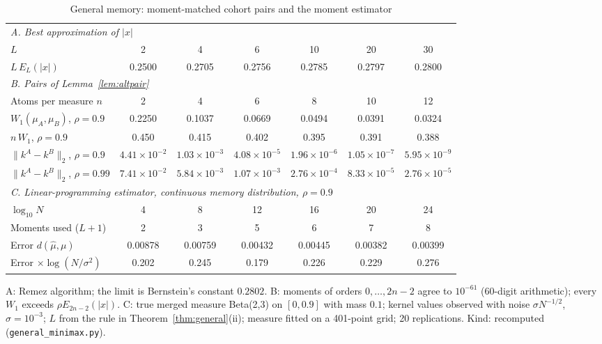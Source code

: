 \begin{table}[t]\centering\small
\begin{threeparttable}
\caption{General memory: moment-matched cohort pairs and the moment estimator}\label{tab:general}
\setlength{\tabcolsep}{3.5pt}
\begin{tabular}{lcccccc}
\toprule
\multicolumn{7}{l}{\emph{A. Best approximation of $|x|$}}\\
$L$ & 2 & 4 & 6 & 10 & 20 & 30\\
$L\,E_L(|x|)$ & 0.2500 & 0.2705 & 0.2756 & 0.2785 & 0.2797 & 0.2800\\
\midrule
\multicolumn{7}{l}{\emph{B. Pairs of Lemma~\ref{lem:altpair}}}\\
Atoms per measure $n$ & 2 & 4 & 6 & 8 & 10 & 12\\
$W_1(\mu_A,\mu_B)$, $\rho=0.9$ & 0.2250 & 0.1037 & 0.0669 & 0.0494 & 0.0391 & 0.0324\\
$n\,W_1$, $\rho=0.9$ & 0.450 & 0.415 & 0.402 & 0.395 & 0.391 & 0.388\\
$\|k^A-k^B\|_2$, $\rho=0.9$ & $4.41\times10^{-2}$ & $1.03\times10^{-3}$ & $4.08\times10^{-5}$ & $1.96\times10^{-6}$ & $1.05\times10^{-7}$ & $5.95\times10^{-9}$\\
$\|k^A-k^B\|_2$, $\rho=0.99$ & $7.41\times10^{-2}$ & $5.84\times10^{-3}$ & $1.07\times10^{-3}$ & $2.76\times10^{-4}$ & $8.33\times10^{-5}$ & $2.76\times10^{-5}$\\
\midrule
\multicolumn{7}{l}{\emph{C. Linear-programming estimator, continuous memory distribution, $\rho=0.9$}}\\
$\log_{10}N$ & 4 & 8 & 12 & 16 & 20 & 24\\
Moments used ($L+1$) & 2 & 3 & 5 & 6 & 7 & 8\\
Error $d(\hat\mu,\mu)$ & 0.00878 & 0.00759 & 0.00432 & 0.00445 & 0.00382 & 0.00399\\
Error $\times\log(N/\sigma^2)$ & 0.202 & 0.245 & 0.179 & 0.226 & 0.229 & 0.276\\
\bottomrule
\end{tabular}
\begin{tablenotes}\footnotesize\item A: Remez algorithm; the limit is Bernstein's constant $0.2802$. B: moments of orders $0,\ldots,2n-2$ agree to $10^{-61}$ (60-digit arithmetic); every $W_1$ exceeds $\rho E_{2n-2}(|x|)$. C: true merged measure Beta(2,3) on $[0,0.9]$ with mass $0.1$; kernel values observed with noise $\sigma N^{-1/2}$, $\sigma=10^{-3}$; $L$ from the rule in Theorem~\ref{thm:general}(ii); measure fitted on a 401-point grid; 20 replications. Kind: recomputed (\texttt{general\_minimax.py}).\end{tablenotes}
\end{threeparttable}
\end{table}

